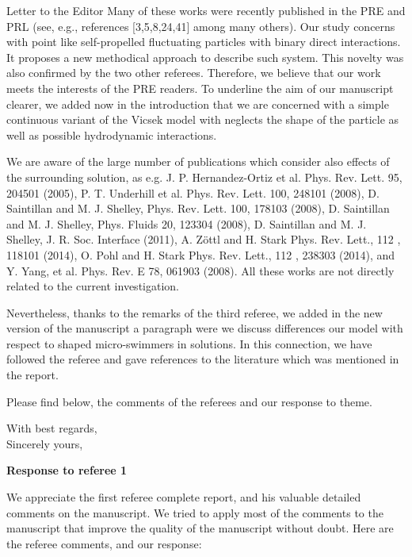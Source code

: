 \documentclass[a4paper,11pt]{letter}
\begin{document}
\begin{letter}{Letter to the Editor}
Many of these works were recently published in the PRE and PRL (see, e.g., references [3,5,8,24,41] among many others). Our study concerns with point like self-propelled fluctuating particles with binary direct interactions. It proposes a new methodical approach to describe such system. This novelty was also confirmed by the two other referees. Therefore, we believe that our work meets the interests of the PRE readers. To underline the aim of our manuscript clearer, we added now in the introduction that we are concerned with a simple continuous variant of the Vicsek model with neglects the shape of the particle as well as possible hydrodynamic interactions.

We are aware of the large number of publications which consider also effects of the surrounding solution, as e.g. J. P. Hernandez-Ortiz et al. Phys. Rev. Lett. 95, 204501 (2005), P. T. Underhill et al. Phys. Rev. Lett. 100, 248101 (2008), D. Saintillan and M. J. Shelley, Phys. Rev. Lett. 100, 178103 (2008), D. Saintillan and M. J. Shelley, Phys. Fluids 20, 123304 (2008), D. Saintillan and M. J. Shelley, J. R. Soc. Interface (2011), A. Zöttl and H. Stark Phys. Rev. Lett., 112 , 118101 (2014), O. Pohl and H. Stark Phys. Rev. Lett., 112 , 238303 (2014), and Y. Yang, et al. Phys. Rev. E 78, 061903 (2008). All these works are not directly related to the current investigation.

Nevertheless, thanks to the remarks of the third referee, we added in the new version of the manuscript a paragraph were we discuss differences our model with respect to shaped micro-swimmers in solutions. In this connection, we have followed the referee and gave references to the literature which was mentioned in the report.

Please find below, the comments of the referees and our response to theme. 



\closing{With best regards,\\ Sincerely yours,}

\end{letter}

\pagebreak

{\Large \bf Response to referee 1}


We appreciate the first referee complete report, and his valuable detailed comments on the manuscript. We tried to apply most of the comments to the manuscript that improve the quality of the manuscript without doubt. Here are the referee comments, and our response:
\end{document}
